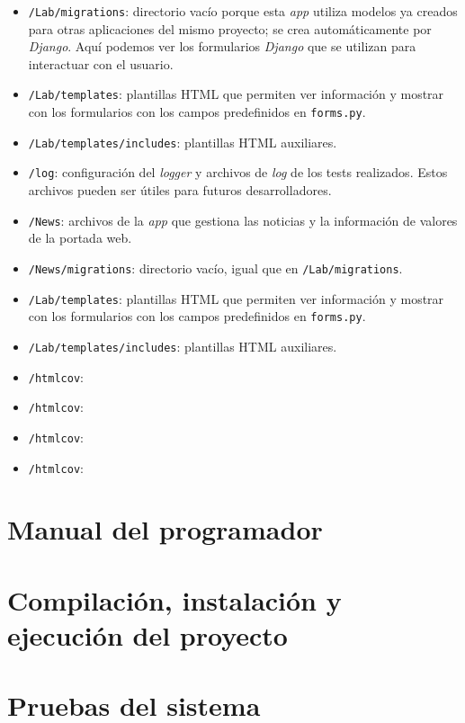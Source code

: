 \begin{itemize}
\item 
\texttt{/Lab/migrations}: directorio vacío porque esta \emph{app} utiliza modelos ya creados para otras aplicaciones del mismo proyecto; se crea automáticamente por \emph{Django}. Aquí podemos ver los formularios \emph{Django} que se utilizan para interactuar con el usuario. 

\item 
\texttt{/Lab/templates}: plantillas HTML que permiten ver información y mostrar con los formularios con los campos predefinidos en \texttt{forms.py}.

\item 
\texttt{/Lab/templates/includes}: plantillas HTML auxiliares.

\item 
\texttt{/log}: configuración del \emph{logger} y archivos de \emph{log} de los tests realizados. Estos archivos pueden ser útiles para futuros desarrolladores.

\item 
\texttt{/News}: archivos de la \emph{app} que gestiona las noticias y la información de valores de la portada web. 

\item 
\texttt{/News/migrations}: directorio vacío, igual que en \texttt{/Lab/migrations}.

\item 
\texttt{/Lab/templates}: plantillas HTML que permiten ver información y mostrar con los formularios con los campos predefinidos en \texttt{forms.py}.

\item 
\texttt{/Lab/templates/includes}: plantillas HTML auxiliares.

\item 
\texttt{/htmlcov}:

\item 
\texttt{/htmlcov}:

\item 
\texttt{/htmlcov}:

\item 
\texttt{/htmlcov}:





\end{itemize}
\section{Manual del programador}

\section{Compilación, instalación y ejecución del proyecto}

\section{Pruebas del sistema}
